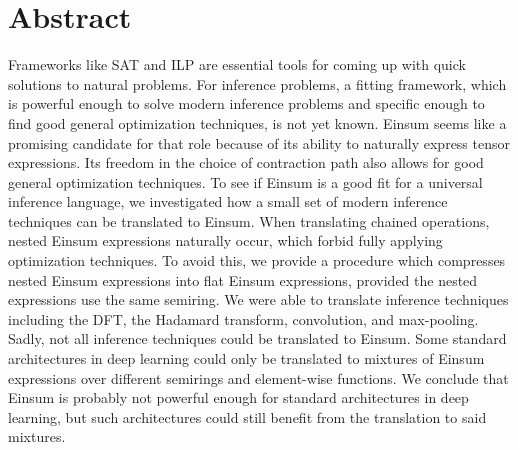 \chapter{Abstract}

Frameworks like SAT and ILP are essential tools for coming up with quick solutions to natural problems.
For inference problems, a fitting framework, which is powerful enough to solve modern inference problems and specific enough to find good general optimization techniques, is not yet known.
Einsum seems like a promising candidate for that role because of its ability to naturally express tensor expressions.
Its freedom in the choice of contraction path also allows for good general optimization techniques.
To see if Einsum is a good fit for a universal inference language,
we investigated how a small set of modern inference techniques can be translated to Einsum.
When translating chained operations, nested Einsum expressions naturally occur, which forbid fully applying optimization techniques.
To avoid this, we provide a procedure which compresses nested Einsum expressions into flat Einsum expressions, provided the nested expressions use the same semiring.
We were able to translate inference techniques including the DFT, the Hadamard transform, convolution, and max-pooling.
Sadly, not all inference techniques could be translated to Einsum.
Some standard architectures in deep learning could only be translated to mixtures of Einsum expressions over different semirings and element-wise functions.
We conclude that Einsum is probably not powerful enough for standard architectures in deep learning,
but such architectures could still benefit from the translation to said mixtures.
